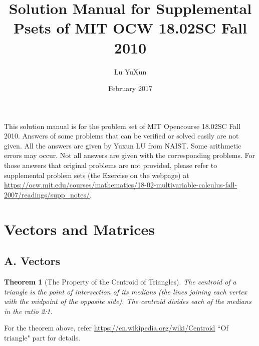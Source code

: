 \documentclass{article}
\title{Solution Manual for Supplemental Psets of MIT OCW 18.02SC Fall 2010}
\author{Lu YuXun}
\date{February 2017}
\newtheorem{theorem}{Theorem}
\begin{document}
\maketitle
This solution manual is for the problem set of MIT Opencourse 18.02SC Fall 2010. Answers of some problems that can be verified or solved easily are not given. All the answers are given by Yuxun LU from NAIST. Some arithmetic errors may occur. Not all answers are given with the corresponding problems. For those answers that original problems are not provided, please refer to supplemental problem sets (the Exercise on the webpage) at \url{https://ocw.mit.edu/courses/mathematics/18-02-multivariable-calculus-fall-2007/readings/supp_notes/}.
\section{Vectors and Matrices}
\subsection{A. Vectors}
\begin{theorem}[The Property of the Centroid of Triangles]
The centroid of a triangle is the point of intersection of its medians (the lines joining each vertex with the midpoint of the opposite side). The centroid divides each of the medians in the ratio 2:1. 
\end{theorem}
For the theorem above, refer \url{https://en.wikipedia.org/wiki/Centroid} ``Of triangle" part for details.
\end{document}
